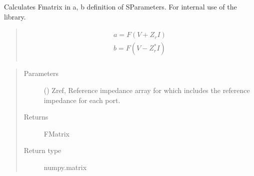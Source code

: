 \documentclass[letterpaper,10pt,english]{sphinxmanual}
\begin{document}
\begin{fulllineitems}
\begin{fulllineitems}
\end{fulllineitems}


\begin{fulllineitems}
\label{\detokenize{touchstone:touchstone.spfile.Ffunc}}
Calculates F\sphinxhyphen{}matrix in a, b definition of S\sphinxhyphen{}Parameters. For internal use of the library.
\begin{quote}
\begin{align*}\!\begin{aligned}
a=F(V+Z_rI)\\
b=F(V-Z_r^*I)\\
\end{aligned}\end{align*}\end{quote}
\begin{quote}\begin{description}
\item[{Parameters}] \leavevmode
{} () \textendash{} Zref, Reference impedance array for which includes the reference impedance for each port.

\item[{Returns}] \leavevmode
F\sphinxhyphen{}Matrix

\item[{Return type}] \leavevmode
numpy.matrix

\end{description}\end{quote}

\end{fulllineitems}



\end{fulllineitems}
\end{document}

